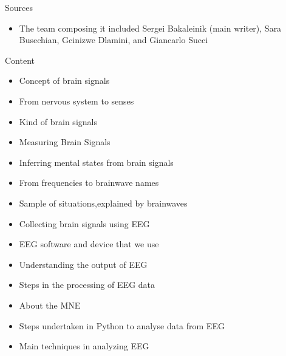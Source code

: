 \documentclass{beamer}
\begin{document}
\begin{frame}
{\centerline{Sources}}
\begin{itemize}
\begin{itemize}
    \item W. Klimesch, M. Doppelmayr, T. Pachinger, and B. Ripper, ``Brain oscillations  and  human  memory:  EEG  correlates  in  the  upper  alpha  and  theta band,'' Neuroscience letters, vol. 238, no. 1-2, pp. 9–12, 1997.
    \item  I. Crk, T. Kluthe, and A. Stefik ``Understanding programming expertise:An empirical study of phasic brain wave changes,''  ACM Transactions on Computer-Human Interaction (TOCHI), vol. 23, no. 1, pp. 1–29, 2015
    \item \href{https://en.wikipedia.org/wiki/10\%5C\%E2\%5C\%80\%5C\%9320_system_(EEG).}{Wikipedia} - 10–20  system  (EEG)
    \item additional resources as specified in each slide
\end{itemize}
\item The team composing it included Sergei Bakaleinik (main writer), Sara Busechian, Gcinizwe Dlamini, and Giancarlo Succi
\end{itemize}

\end{frame}


\begin{frame}
{\centerline{Content}}
\begin{itemize}
    \item Concept of brain signals
    \item From nervous system to senses
    \item Kind of brain signals
    \item Measuring Brain Signals
    \item Inferring mental states from brain signals
    \item From frequencies to brainwave names
    \item Sample of situations,explained by brainwaves
    \item Collecting brain signals using EEG
    \item EEG software and device that we use
    \item Understanding the output of EEG
    \item Steps in the processing of EEG data
    \item About the MNE
    \item Steps undertaken in Python to analyse data from EEG
    \item Main techniques in analyzing EEG 
\end{itemize}
\end{frame}
\end{document}
